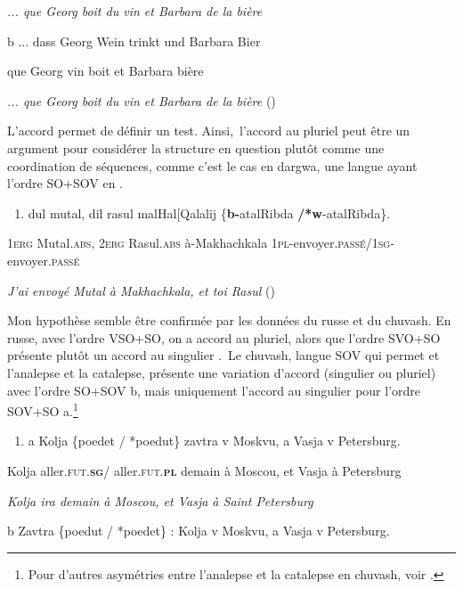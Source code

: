 \textit{... que Georg boit du vin et Barbara de la bière}          

  b  ... dass Georg Wein trinkt und Barbara Bier

que Georg vin boit et Barbara bière 

\textit{    ... que Georg boit du vin et Barbara de la bière }   (\citet[43]{Haspelmath2007})

L'accord permet de définir un test. Ainsi,~l'accord au pluriel peut être un argument pour considérer la structure en question plutôt comme une coordination de séquences, comme c'est le cas en dargwa, une langue ayant l'ordre SO+SOV en .


\begin{enumerate}
\item \label{bkm:Ref289274278}dul  mutal,     dil  rasul     malHal[Qalalij \{\textbf{b-}atalRibda \textbf{/*w}-atalRibda\}.  


\end{enumerate}
  1\textsc{erg} Mutal\textsc{.abs, 2erg} Rasul.\textsc{abs} à-Makhachkala\textbf{\textsc{} }\textsc{1pl-}envoyer.\textsc{passé/1sg-}envoyer.\textsc{passé}

  \textit{J'ai envoyé Mutal à Makhachkala, et toi Rasul}         (\citet{Kazenin2001})

Mon hypothèse semble être confirmée par les données du russe et du chuvash. En russe, avec l'ordre VSO+SO, on a accord au pluriel, alors que l'ordre SVO+SO présente plutôt un accord au singulier .~Le chuvash, langue SOV qui permet et l'analepse et la catalepse, présente une variation d'accord (singulier ou pluriel) avec l'ordre SO+SOV b, mais uniquement l'accord au singulier pour l'ordre SOV+SO a.\footnote{Pour d'autres asymétries entre l'analepse et la catalepse en chuvash, voir \citet{Kazenin2001}.}  


\begin{enumerate}
\item \label{bkm:Ref287483754}a  Kolja \{poedet / *poedut\}     zavtra v Moskvu, a Vasja v Petersburg.


\end{enumerate}
Kolja aller.\textsc{fut.}\textbf{\textsc{sg}}\textsc{/} aller.\textsc{fut.}\textbf{\textsc{pl}} demain à Moscou, et Vasja à Petersburg

{\itshape
Kolja ira demain à Moscou, et Vasja à Saint Petersburg}

 b  Zavtra \{poedut / *poedet\} :  Kolja v Moskvu, a Vasja v Petersburg.

